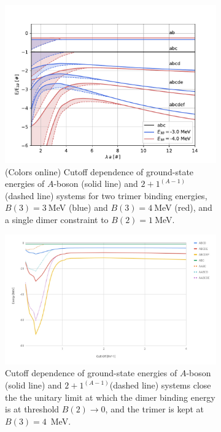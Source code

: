 \documentclass[preprint,12pt]{elsarticle}
\newcommand{\abb}{\ensuremath{2\!+\!1^{(A-1)}}}
\begin{document}
\begin{figure}
    \centering
    \begin{subfigure}[t]{0.45\textwidth}
        \centering
        \includegraphics[width=\linewidth]{./p-systems-vs-l} 
        \caption{(Colors online) Cutoff dependence of ground-state energies of $A$-boson (solid line) and \abb
        (dashed line) systems for two trimer binding energies, $B(3)=3~$MeV (blue) and $B(3)=4~$MeV (red), and
        a single dimer constraint to $B(2)=1~$MeV.}
        \label{fig:threshold}
    \end{subfigure}
    \hfill
    \begin{subfigure}[t]{0.45\textwidth}
        \centering
        \includegraphics[width=\linewidth]{./unitarity_chart} 
        \caption{Cutoff dependence of ground-state energies of $A$-boson (solid line) and \abb (dashed line) systems 
        close the the unitary limit at which the dimer binding energy is at threshold $B(2)\to 0$,  and the trimer
        is kept at $B(3)=4$~MeV.}  
        \label{fig:unitary}
    \end{subfigure}
\caption{}
\end{figure} 
\end{document}
